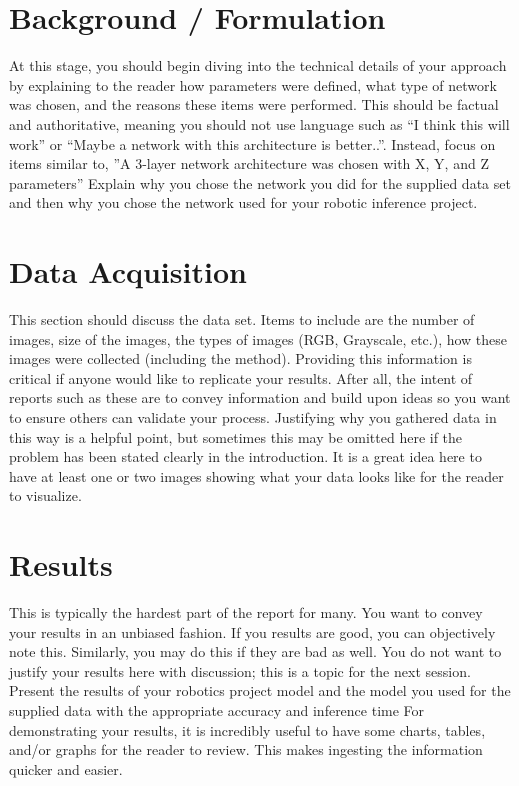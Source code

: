 \documentclass[10pt,journal,compsoc]{IEEEtran}
\begin{document}
	
\section{Background / Formulation}


At this stage, you should begin diving into the technical details of your approach by explaining to the reader how parameters were defined, what type of network was chosen, and the reasons these items were performed. This should be factual and authoritative, meaning you should not use language such as “I think this will work” or “Maybe a network with this architecture is better..”. Instead, focus on items similar to, ”A 3-layer network architecture was chosen with X, Y, and Z parameters” 
Explain why you chose the network you did for the supplied data set and then why you chose the network used for your robotic inference project. \cite{lamport1994latex}
		
\section{Data Acquisition}
This section should discuss the data set. Items to include are the number of images, size of the images, the types of images (RGB, Grayscale, etc.), how these images were collected (including the method). Providing this information is critical if anyone would like to replicate your results. After all, the intent of reports such as these are to convey information and build upon ideas so you want to ensure others can validate your process.
Justifying why you gathered data in this way is a helpful point, but sometimes this may be omitted here if the problem has been stated clearly in the introduction.
It is a great idea here to have at least one or two images showing what your data looks like for the reader to visualize.

\section{Results}
This is typically the hardest part of the report for many. You want to convey your results in an unbiased fashion. If you results are good, you can objectively note this. Similarly, you may do this if they are bad as well. You do not want to justify your results here with discussion; this is a topic for the next session. 
Present the results of your robotics project model and the model you used for the supplied data with the appropriate accuracy and inference time
For demonstrating your results, it is incredibly useful to have some charts, tables, and/or graphs for the reader to review. This makes ingesting the information quicker and easier.
\end{document}
